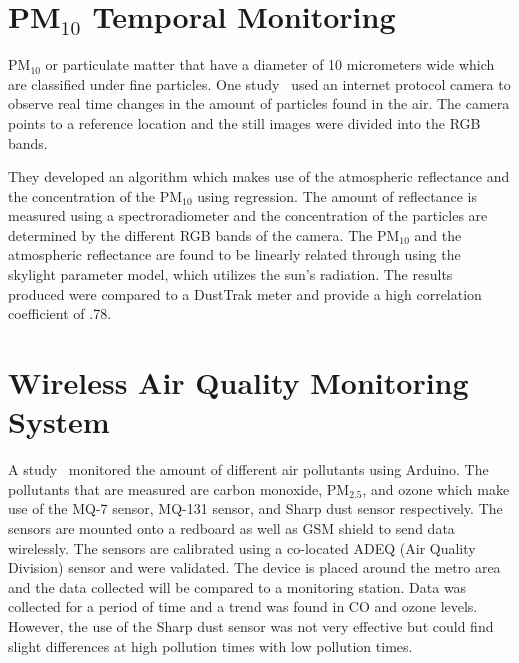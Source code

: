 
\section{PM$_{10}$ Temporal Monitoring}

PM$_{10}$ or particulate matter that have a diameter of 10 micrometers wide which are classified under fine particles. One study~\cite{Wong} used an internet protocol camera to observe real time changes in the amount of particles found in the air. The camera points to a reference location and the still images were divided into the RGB bands.

They developed an algorithm which makes use of the atmospheric reflectance and the concentration of the PM$_{10}$ using regression. The amount of reflectance is measured using a spectroradiometer and the concentration of the particles are determined by the different RGB bands of the camera. The PM$_{10}$ and the atmospheric reflectance are found to be linearly related through using the skylight parameter model, which utilizes the sun's radiation. The results produced were compared to a DustTrak meter and provide a high correlation coefficient of .78. 

\section{Wireless Air Quality Monitoring System}

A study~\cite{Reilly} monitored the amount of different air pollutants using Arduino. The pollutants that are measured are carbon monoxide, PM$_{2.5}$, and ozone which make use of the MQ-7 sensor, MQ-131 sensor, and Sharp dust sensor respectively. The sensors are mounted onto a redboard as well as GSM shield to send data wirelessly. The sensors are calibrated using a co-located ADEQ (Air Quality Division) sensor and were validated. The device is placed around the metro area and the data collected will be compared to a monitoring station.  Data was collected for a period of time and a trend was found in CO and ozone levels. However, the use of the Sharp dust sensor was not very effective but could find slight differences at high pollution times with low pollution times.

